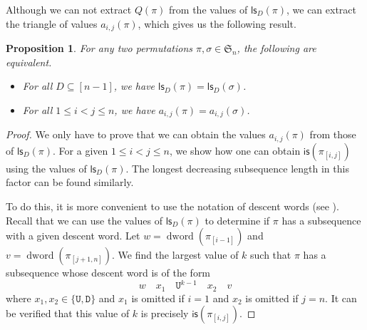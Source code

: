 \documentclass[12pt]{article}
\newcommand{\is}{\mathsf{is}}
\newcommand{\ls}{\mathsf{ls}}
\newcommand{\s}{\mathfrak{S}}
\newcommand{\dword}{\operatorname{dword}}
\newcommand{\desword}[1]{\mathtt{#1}}
\newtheorem{proposition}[theorem]{Proposition}
\theoremstyle{definition}
\begin{document}
Although we can not extract $Q(\pi)$ from the values of $\ls_D(\pi)$, we can extract the triangle of values $a_{i, j}(\pi)$, which gives us the following result.

\begin{proposition}\label{equivalence}
    For any two permutations $\pi, \sigma \in \s_n$, the following are equivalent.
    \begin{itemize}
        \item For all $D \subseteq [n - 1]$, we have $\ls_D(\pi) = \ls_D(\sigma)$.

        \item For all $1 \leq i < j \leq n$, we have $a_{i, j}(\pi) = a_{i, j}(\sigma)$.
    \end{itemize}
\end{proposition}

\begin{proof}
    We only have to prove that we can obtain the values $a_{i, j}(\pi)$ from those of $\ls_D(\pi)$. 
    For a given $1 \leq i < j \leq n$, we show how one can obtain $\is(\pi_{[i, j]})$ using the values of $\ls_D(\pi)$. 
    The longest decreasing subsequence length in this factor can be found similarly.
    
    To do this, it is more convenient to use the notation of descent words (see ). 
    Recall that we can use the values of $\ls_D(\pi)$ to determine if $\pi$ has a subsequence with a given descent word. 
    Let $w = \dword(\pi_{[i - 1]})$ and $v = \dword(\pi_{[j + 1, n]})$. 
    We find the largest value of $k$ such that $\pi$ has a subsequence whose descent word is of the form
    \begin{equation*}
        w\quad x_1 \quad \desword{U}^{k - 1}\quad x_2\quad v
    \end{equation*}
    where $x_1, x_2 \in \{\desword{U}, \desword{D}\}$ and $x_1$ is omitted if $i = 1$ and $x_2$ is omitted if $j = n$. 
    It can be verified that this value of $k$ is precisely $\is(\pi_{[i, j]})$.
\end{proof}

\end{document}
